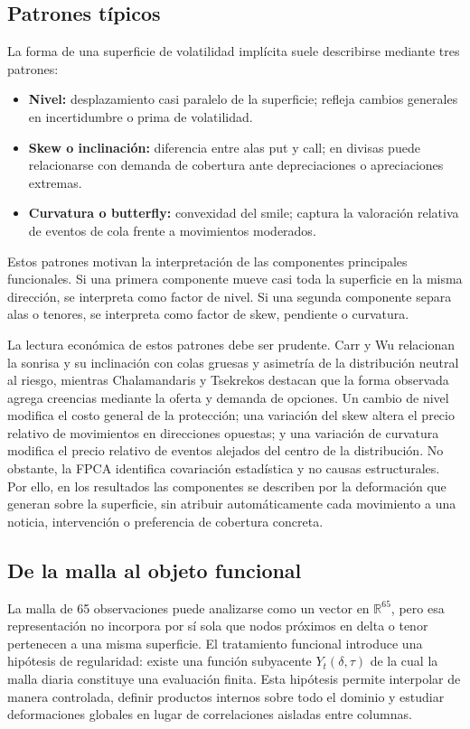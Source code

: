 \documentclass[a4paper,11pt]{article}
\newcommand{\SVI}{superficie de volatilidad implícita}
\newcommand{\R}{\mathbb{R}}
\begin{document}
\subsection{Patrones típicos}

La forma de una \SVI{} suele describirse mediante tres patrones:
\begin{itemize}
  \item \textbf{Nivel:} desplazamiento casi paralelo de la superficie; refleja cambios generales en incertidumbre o prima de volatilidad.
  \item \textbf{Skew o inclinación:} diferencia entre alas put y call; en divisas puede relacionarse con demanda de cobertura ante depreciaciones o apreciaciones extremas.
  \item \textbf{Curvatura o butterfly:} convexidad del smile; captura la valoración relativa de eventos de cola frente a movimientos moderados.
\end{itemize}
Estos patrones motivan la interpretación de las componentes principales funcionales. Si una primera componente mueve casi toda la superficie en la misma dirección, se interpreta como factor de nivel. Si una segunda componente separa alas o tenores, se interpreta como factor de skew, pendiente o curvatura.

La lectura económica de estos patrones debe ser prudente. Carr y Wu \cite{CarrWu2007} relacionan la sonrisa y su inclinación con colas gruesas y asimetría de la distribución neutral al riesgo, mientras Chalamandaris y Tsekrekos \cite{ChalamandarisTsekrekos2010} destacan que la forma observada agrega creencias mediante la oferta y demanda de opciones. Un cambio de nivel modifica el costo general de la protección; una variación del skew altera el precio relativo de movimientos en direcciones opuestas; y una variación de curvatura modifica el precio relativo de eventos alejados del centro de la distribución. No obstante, la FPCA identifica covariación estadística y no causas estructurales. Por ello, en los resultados las componentes se describen por la deformación que generan sobre la superficie, sin atribuir automáticamente cada movimiento a una noticia, intervención o preferencia de cobertura concreta.

\subsection{De la malla al objeto funcional}

La malla de 65 observaciones puede analizarse como un vector en \(\R^{65}\), pero esa representación no incorpora por sí sola que nodos próximos en delta o tenor pertenecen a una misma superficie. El tratamiento funcional introduce una hipótesis de regularidad: existe una función subyacente \(Y_t(\delta,\tau)\) de la cual la malla diaria constituye una evaluación finita. Esta hipótesis permite interpolar de manera controlada, definir productos internos sobre todo el dominio y estudiar deformaciones globales en lugar de correlaciones aisladas entre columnas.
\end{document}
